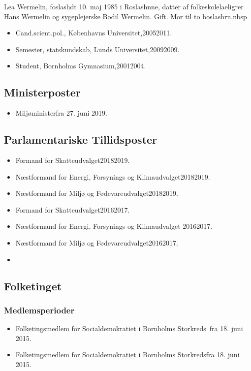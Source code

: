 \documentclass[11pt, a4paper]{awesome-cv}
\begin{document}
\makecvheader[R]
\makelettertitle
\begin{cvletter}
Lea Wermelin, foslashdt 10. maj 1985 i Roslashnne, datter af folkeskolelaeligrer Hans Wermelin og sygeplejerske Bodil Wermelin. Gift. Mor til to boslashrn.nbsp

\begin{itemize}
\item Cand.scient.pol., Københavns Universitet,20052011.
\item Semester, statskundskab, Lunds Universitet,20092009.
\item Student, Bornholms Gymnasium,20012004.
\end{itemize}
\subsection*{Ministerposter}
\begin{itemize}
\item Miljøministerfra 27. juni 2019.
\end{itemize}
\subsection*{Parlamentariske Tillidsposter}
\begin{itemize}
\item Formand for Skatteudvalget20182019.
\item Næstformand for Energi, Forsynings og Klimaudvalget20182019.
\item Næstformand for Miljø og Fødevareudvalget20182019.
\item Formand for Skatteudvalget20162017.
\item Næstformand for Energi, Forsynings og Klimaudvalget 20162017.
\item Næstformand for Miljø og Fødevareudvalget20162017.
\item 
\end{itemize}
\subsection*{Folketinget}
\subsubsection*{Medlemsperioder}
\begin{itemize}
\item Folketingsmedlem for Socialdemokratiet i Bornholms Storkreds fra 18. juni 2015.
\item Folketingsmedlem for Socialdemokratiet i Bornholms Storkredsfra 18. juni 2015.
\end{itemize}

\end{cvletter}
\end{document}
